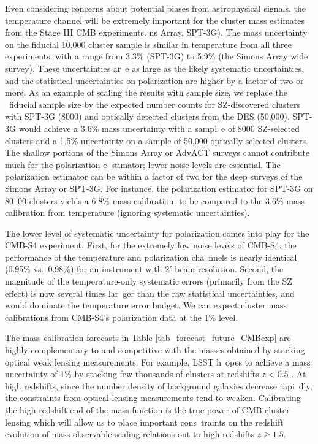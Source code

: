 Even considering concerns about potential biases from astrophysical signals, the temperature channel will be extremely important for the cluster mass estimates from the Stage III CMB experiments.%
ns Array, SPT-3G).
 The mass uncertainty on the fiducial 10,000 cluster sample  is similar in temperature from all three experiments, with a range from 3.3\% (SPT-3G) to 5.9\% (the Simons Array wide survey). These uncertainties ar\
e as large as the likely systematic uncertainties, and the statistical uncertainties on polarization are higher by a factor of two or more. As an example of scaling the results with sample size, we replace the \
fiducial sample size by the expected number counts for SZ-discovered clusters with SPT-3G (8000) and optically detected clusters from the DES (50,000). SPT-3G would achieve a 3.6\% mass uncertainty with a sampl\
e of 8000 SZ-selected clusters and a 1.5\% uncertainty on a sample of 50,000 optically-selected clusters. The shallow portions of the Simons Array or AdvACT surveys cannot contribute much for the polarization e\
stimator; lower noise levels are essential. The polarization estimator can be within a factor of two for the deep surveys of the Simons Array or SPT-3G. For instance, the polarization estimator for SPT-3G on 80\
00 clusters yields a 6.8\% mass calibration, to be compared to the 3.6\% mass calibration from temperature (ignoring systematic uncertainties).


The lower level of systematic uncertainty for polarization comes into play for the CMB-S4 experiment. First, for the extremely low noise levels of CMB-S4, the performance of the temperature and polarization cha\
nnels is nearly identical (0.95\% vs.~0.98\%) for an instrument with $2'$ beam resolution. Second, the magnitude of the temperature-only systematic errors (primarily from the SZ effect) is now several times lar\
ger than the raw statistical uncertainties, and would dominate the temperature error budget. We can expect cluster mass calibrations from CMB-S4's polarization data at the 1\% level.

The mass calibration forecasts in  Table \ref{tab_forecast_future_CMBexp} are highly complementary  to and competitive with the masses obtained by stacking optical weak lensing measurements. For example, LSST h\
opes to achieve a mass uncertainty of 1\% by stacking few thousands of clusters at redshifts $z < 0.5$ \citep{lsst_science_book}. At high redshifts, since the number density of background galaxies decrease rapi\
dly, the constraints from optical lensing measurements tend to weaken. Calibrating the high redshift end of the mass function is the true power of CMB-cluster lensing which will allow us to place important cons\
traints on the redshift evolution of mass-observable scaling relations out to high redshifts $z \ge 1.5$.

